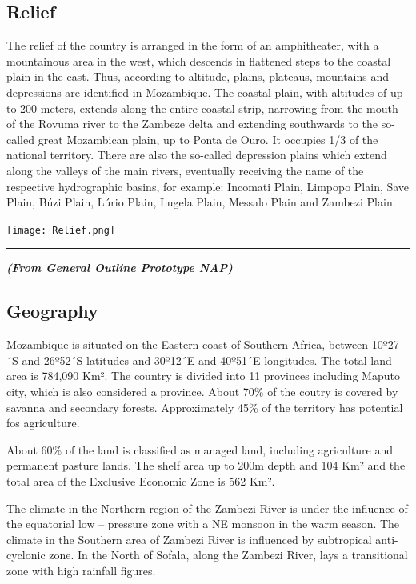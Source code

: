 \documentclass[
]{book}
\begin{document}
\hypertarget{relief}{%
\subsection{Relief}\label{relief}}

The relief of the country is arranged in the form of an amphitheater, with a mountainous area in the west, which descends in flattened steps to the coastal plain in the east. Thus, according to altitude, plains, plateaus, mountains and depressions are identified in Mozambique. The coastal plain, with altitudes of up to 200 meters, extends along the entire coastal strip, narrowing from the mouth of the Rovuma river to the Zambeze delta and extending southwards to the so-called great Mozambican plain, up to Ponta de Ouro. It occupies 1/3 of the national territory. There are also the so-called depression plains which extend along the valleys of the main rivers, eventually receiving the name of the respective hydrographic basins, for example: Incomati Plain, Limpopo Plain, Save Plain, Búzi Plain, Lúrio Plain, Lugela Plain, Messalo Plain and Zambezi Plain.

\texttt{[image: Relief.png]}

\begin{center}\rule{0.5\linewidth}{0.5pt}\end{center}

\textbf{\emph{(From General Outline Prototype NAP)}}

\hypertarget{geography-1}{%
\subsection{Geography}\label{geography-1}}

Mozambique is situated on the Eastern coast of Southern Africa, between 10º27´S and 26º52´S latitudes and 30º12´E and 40º51´E longitudes. The total land area is 784,090 Km². The country is divided into 11 provinces including Maputo city, which is also considered a province. About 70\% of the coutry is covered by savanna and secondary forests. Approximately 45\% of the territory has potential fos agriculture.

About 60\% of the land is classified as managed land, including agriculture and permanent pasture lands. The shelf area up to 200m depth and 104 Km² and the total area of the Exclusive Economic Zone is 562 Km².

The climate in the Northern region of the Zambezi River is under the influence of the equatorial low -- pressure zone with a NE monsoon in the warm season. The climate in the Southern area of Zambezi River is influenced by subtropical anti-cyclonic zone. In the North of Sofala, along the Zambezi River, lays a transitional zone with high rainfall figures.
\end{document}
